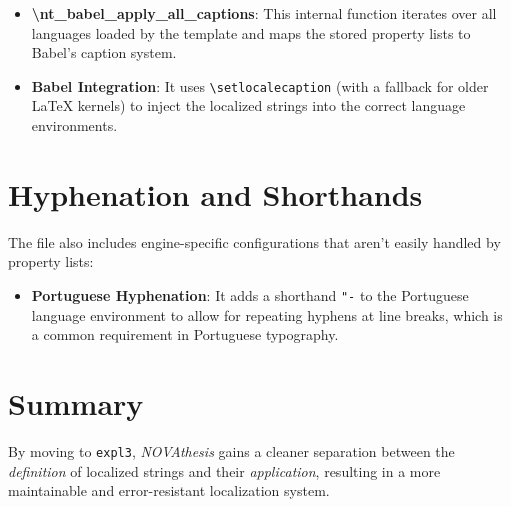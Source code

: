 \begin{itemize}
    \item \textbf{\textbackslash nt\_babel\_apply\_all\_captions}: This internal function iterates over all languages loaded by the template and maps the stored property lists to Babel's caption system.
    \item \textbf{Babel Integration}: It uses \texttt{\textbackslash setlocalecaption} (with a fallback for older \LaTeX{} kernels) to inject the localized strings into the correct language environments.
\end{itemize}

\section{Hyphenation and Shorthands}
The file also includes engine-specific configurations that aren't easily handled by property lists:
\begin{itemize}
    \item \textbf{Portuguese Hyphenation}: It adds a shorthand \texttt{"-} to the Portuguese language environment to allow for repeating hyphens at line breaks, which is a common requirement in Portuguese typography.
\end{itemize}

\section{Summary}
By moving to \texttt{expl3}, \emph{NOVAthesis} gains a cleaner separation between the \emph{definition} of localized strings and their \emph{application}, resulting in a more maintainable and error-resistant localization system.
